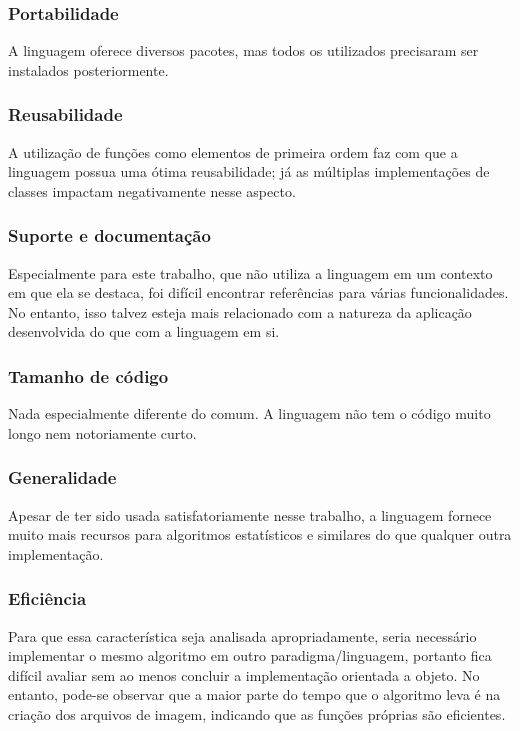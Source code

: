 \documentclass[rel_mlp]{iiufrgs}
\begin{document}
\subsubsection{Portabilidade}
A linguagem oferece diversos pacotes, mas todos os utilizados precisaram ser instalados posteriormente.

\subsubsection{Reusabilidade}
A utilização de funções como elementos de primeira ordem faz com que a linguagem possua uma ótima reusabilidade; já as
múltiplas implementações de classes impactam negativamente nesse aspecto.

\subsubsection{Suporte e documentação}
Especialmente para este trabalho, que não utiliza a linguagem em um contexto em que ela se destaca, foi difícil encontrar referências para várias funcionalidades. No entanto, isso talvez esteja mais relacionado com a natureza da aplicação desenvolvida do que com a linguagem em si.

\subsubsection{Tamanho de código}
Nada especialmente diferente do comum. A linguagem não tem o código muito longo nem notoriamente curto.

\subsubsection{Generalidade}
Apesar de ter sido usada satisfatoriamente nesse trabalho, a linguagem fornece muito mais recursos para algoritmos estatísticos e similares do que qualquer outra implementação.

\subsubsection{Eficiência}
Para que essa característica seja analisada apropriadamente, seria necessário implementar o mesmo algoritmo em outro paradigma/linguagem, portanto fica difícil avaliar sem ao menos concluir a implementação orientada a objeto. No entanto, pode-se observar que a maior parte do tempo que o algoritmo leva é na criação dos arquivos de imagem, indicando que as funções próprias são eficientes.
\end{document}
